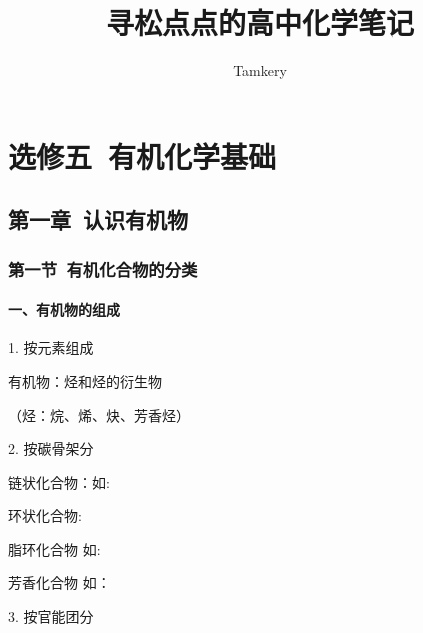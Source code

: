 \documentclass{book}
\title{寻松点点的高中化学笔记}
\author{Tamkery }
\begin{document}
\maketitle
\tableofcontents


\part{选修五\ 有机化学基础}

\chapter{第一章\ 认识有机物}

\section{第一节\ 有机化合物的分类}	

\subsection{一、有机物的组成}
1. 按元素组成 \par
有机物：烃和烃的衍生物 \par
（烃：烷、烯、炔、芳香烃）
\newline \par
2. 按碳骨架分\par
链状化合物：如:
\newline \par
环状化合物:\par
脂环化合物 如:\hspace{0.8mm} \par
芳香化合物 如：
\newline \par

3. 按官能团分
\end{document}
